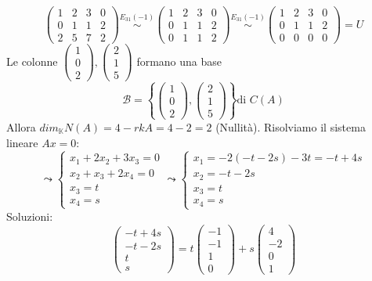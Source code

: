 \documentclass[12pt]{article}
\begin{document}
\[\begin{pmatrix}
    1 & 2 & 3 & 0\\
    0 & 1 & 1 & 2\\
    2 & 5 & 7 & 2
\end{pmatrix} \stackrel{E_{31}(-1)}{\sim} \begin{pmatrix}
    1 & 2 & 3 & 0\\
    0 & 1 & 1 & 2\\
    0 & 1 & 1 & 2
\end{pmatrix} \stackrel{E_{31}(-1)}{\sim} \begin{pmatrix}
    1 & 2 & 3 & 0\\
    0 & 1 & 1 & 2\\
    0 & 0 & 0 & 0
\end{pmatrix} = U\]
Le colonne $\begin{pmatrix}
    1\\
    0\\
    2
\end{pmatrix}, \begin{pmatrix}
    2\\
    1\\
    5
\end{pmatrix}$ formano una base
\[\mathcal{B} = \left\{\begin{pmatrix}
    1\\
    0\\
    2
\end{pmatrix}, \begin{pmatrix}
    2\\
    1\\
    5
\end{pmatrix}\right\} \text{di }C(A)\]
Allora $dim_{\mathbb{K}}N(A) = 4 - rkA = 4 - 2 = 2$ (Nullità).
Risolviamo il sistema lineare $Ax = 0:$
\[\leadsto \begin{cases}
    x_1 + 2x_2 + 3x_3 = 0\\
    x_2 + x_3 + 2x_4 = 0\\
    x_3 = t\\
    x_4 = s
\end{cases} \leadsto \begin{cases}
    x_1 = -2(-t-2s) - 3t = -t + 4s\\
    x_2 = -t - 2s\\
    x_3 = t\\
    x_4 = s
\end{cases}\]
Soluzioni:
\[\begin{pmatrix}
    -t + 4s\\
    -t - 2s\\
    t\\
    s
\end{pmatrix} = t\begin{pmatrix}
    -1\\
    -1\\
    1\\
    0
\end{pmatrix} + s\begin{pmatrix}
    4\\
    -2\\
    0\\
    1
\end{pmatrix}\]
\end{document}

